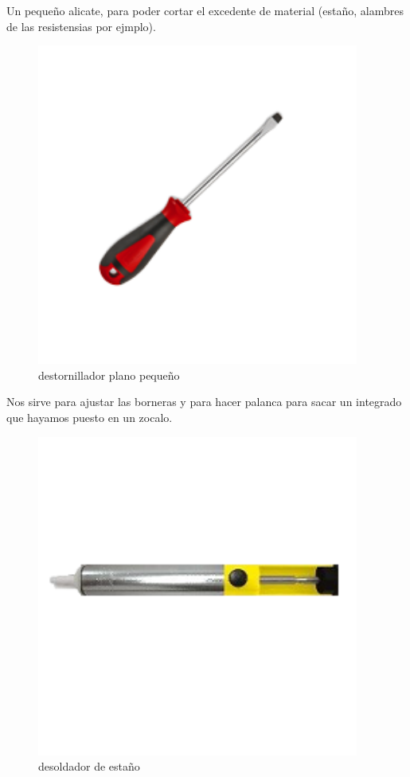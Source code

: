 \documentclass[letterpaper,10pt,english]{sphinxmanual}
\begin{document}
Un pequeño alicate, para poder cortar el excedente de material (estaño,
alambres de las resistensias por ejmplo).
\newpage\begin{figure}[htbp]
\centering
\capstart

\includegraphics[width=300pt]{destornillador.png}
\caption{destornillador plano pequeño}\end{figure}

Nos sirve para ajustar las borneras y para hacer palanca para sacar un
integrado que hayamos puesto en un zocalo.
\newpage\begin{figure}[htbp]
\centering
\capstart

\includegraphics[width=300pt]{desoldador.png}
\caption{desoldador de estaño}\end{figure}
\end{document}
